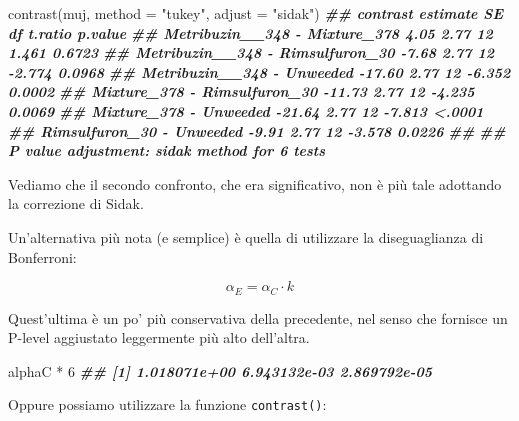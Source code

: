 \documentclass[
  12pt,
]{book}
\newenvironment{Shaded}{\begin{snugshade}}{\end{snugshade}}
\newcommand{\AttributeTok}[1]{\textcolor[rgb]{0.77,0.63,0.00}{#1}}
\newcommand{\DecValTok}[1]{\textcolor[rgb]{0.00,0.00,0.81}{#1}}
\newcommand{\DocumentationTok}[1]{\textcolor[rgb]{0.56,0.35,0.01}{\textbf{\textit{#1}}}}
\newcommand{\FunctionTok}[1]{\textcolor[rgb]{0.00,0.00,0.00}{#1}}
\newcommand{\NormalTok}[1]{#1}
\newcommand{\SpecialCharTok}[1]{\textcolor[rgb]{0.00,0.00,0.00}{#1}}
\newcommand{\StringTok}[1]{\textcolor[rgb]{0.31,0.60,0.02}{#1}}
\begin{document}
\begin{Shaded}
\begin{Highlighting}[]
\FunctionTok{contrast}\NormalTok{(muj, }\AttributeTok{method =} \StringTok{"tukey"}\NormalTok{, }\AttributeTok{adjust =} \StringTok{"sidak"}\NormalTok{)}
\DocumentationTok{\#\#  contrast                         estimate   SE df t.ratio p.value}
\DocumentationTok{\#\#  Metribuzin\_\_348 {-} Mixture\_378        4.05 2.77 12   1.461  0.6723}
\DocumentationTok{\#\#  Metribuzin\_\_348 {-} Rimsulfuron\_30    {-}7.68 2.77 12  {-}2.774  0.0968}
\DocumentationTok{\#\#  Metribuzin\_\_348 {-} Unweeded         {-}17.60 2.77 12  {-}6.352  0.0002}
\DocumentationTok{\#\#  Mixture\_378 {-} Rimsulfuron\_30       {-}11.73 2.77 12  {-}4.235  0.0069}
\DocumentationTok{\#\#  Mixture\_378 {-} Unweeded             {-}21.64 2.77 12  {-}7.813  \textless{}.0001}
\DocumentationTok{\#\#  Rimsulfuron\_30 {-} Unweeded           {-}9.91 2.77 12  {-}3.578  0.0226}
\DocumentationTok{\#\# }
\DocumentationTok{\#\# P value adjustment: sidak method for 6 tests}
\end{Highlighting}
\end{Shaded}

\normalsize

Vediamo che il secondo confronto, che era significativo, non è più tale adottando la correzione di Sidak.

Un'alternativa più nota (e semplice) è quella di utilizzare la diseguaglianza di Bonferroni:

\[\alpha_E = \alpha_C \cdot k\]

Quest'ultima è un po' più conservativa della precedente, nel senso che fornisce un P-level aggiustato leggermente più alto dell'altra.

\begin{Shaded}
\begin{Highlighting}[]
\NormalTok{alphaC }\SpecialCharTok{*} \DecValTok{6}
\DocumentationTok{\#\# [1] 1.018071e+00 6.943132e{-}03 2.869792e{-}05}
\end{Highlighting}
\end{Shaded}

Oppure possiamo utilizzare la funzione \texttt{contrast()}:
\end{document}
